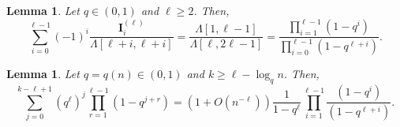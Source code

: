 \documentclass[letterpaper,11pt]{article}
\newtheorem{lemma}[theorem]{Lemma}
\theoremstyle{definition}
\theoremstyle{remark}
\renewcommand{\ge}{\geqslant}
\renewcommand{\geq}{\geqslant}
\newcommand{\product}{\Lambda}
\newcommand{\sumI}{\mathbf{I}}
\begin{document}
\begin{lemma}\label{Lem:Qk:SumIProp}
	Let $q\in (0,1)$ and $\ell\geq 2$. Then, 
	\begin{equation*}
		\sum_{i=0}^{\ell-1}(-1)^{i}\frac{\sumI_{i}^{(\ell)}}{\product[\ell+i,\ell+i]}=\frac{\product[1,\ell-1]}{\product[\ell,2\ell-1]}=
		\frac{\prod_{i=1}^{\ell-1}(1-q^i)}{\prod_{i=0}^{\ell-1}(1-q^{\ell+i})}.
	\end{equation*}
\end{lemma}

\begin{lemma}\label{Lem:AuxiliarySum} Let $q =q(n)\in (0,1)$ and $k\ge \ell -\log_q n$. Then, 
	\[\sum_{j=0}^{k-\ell+1}\left(q^{\ell}\right)^j\prod_{r=1}^{\ell-1}(1-q^{j+r})
	=(1+O(n^{-\ell}))\frac{1}{1-q^\ell}\prod_{i=1}^{\ell-1}\frac{(1-q^i)}{(1-q^{\ell+i})}.\]
\end{lemma}
\end{document}
